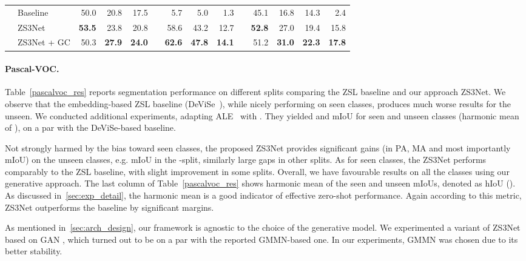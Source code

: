 \documentclass{article}
\begin{document}
\begin{table}
{\begin{tabular}{clrrrrrrrrrrrr}
\hline\noalign{\smallskip}
\multirow{4}{*}{10} & Baseline & 50.0 & 20.8  & 17.5 && 5.7 & 5.0 & 1.3 &&  45.1 & 16.8 & 14.3 & 2.4  \\ 
&  ZS3Net  & \bf 53.5 &   23.8 &  20.8  &&  58.6   &   43.2  &  12.7 && \bf 52.8  &  27.0  &  19.4 &  15.8 \\
&  ZS3Net + GC  & 50.3 & \bf 27.9   & \bf 24.0 && \bf 62.6  &  \bf 47.8  & \bf 14.1 && 51.2 & \bf 31.0 & \bf 22.3 & \bf  17.8 \\ \hline
\end{tabular}
}
\vspace{-0.4cm}
\label{pascalcontext_res}
\end{table}

\paragraph{Pascal-VOC.} Table~\ref{pascalvoc_res} reports segmentation performance on  different splits comparing the ZSL baseline and our approach ZS3Net.
We observe that the embedding-based ZSL baseline (DeViSe~\cite{frome2013devise}), while nicely performing on seen classes, produces much worse results for the unseen. 
We conducted additional experiments, adapting ALE~\cite{akata2015label} with .
They yielded  and  mIoU for seen and unseen classes (harmonic mean of ), on a par with the DeViSe-based baseline.

Not strongly harmed by the bias toward seen classes, the proposed ZS3Net provides significant gains (in PA, MA and most importantly mIoU) on the unseen classes, e.g.  mIoU in the -split, similarly large gaps in other splits.
As for seen classes, the ZS3Net performs comparably to the ZSL baseline, with slight improvement in some splits.
Overall, we have favourable results on all the classes using our generative approach.
The last column of Table~\ref{pascalvoc_res} shows harmonic mean of the seen and unseen mIoUs, denoted as hIoU ().
As discussed in~\ref{sec:exp_detail}, the harmonic mean is a good indicator of effective zero-shot performance.
Again according to this metric, ZS3Net outperforms the baseline by significant margins.


As mentioned in~\ref{sec:arch_design}, our framework is agnostic to the choice of the generative model.
We experimented a variant of ZS3Net based on GAN \cite{xian2018feature}, which turned out to be on a par with the reported GMMN-based one.
In our experiments, GMMN was chosen due to its better stability.
\end{document}
